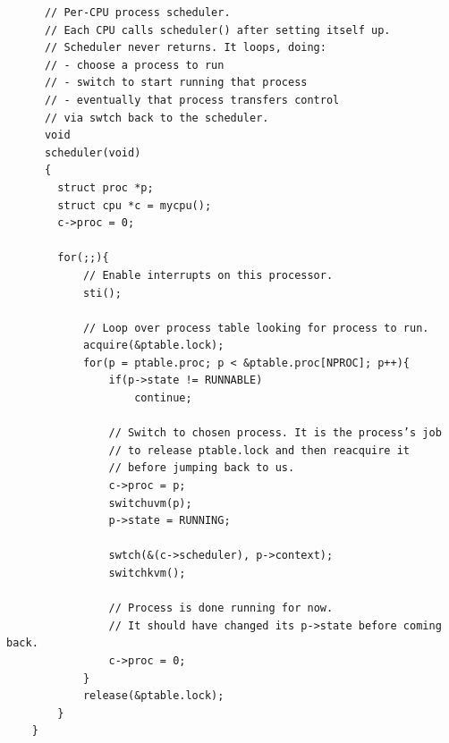 \documentclass[titlepage,a4paper]{article}
\begin{document}
\begin{verbatim}
      // Per-CPU process scheduler.
      // Each CPU calls scheduler() after setting itself up.
      // Scheduler never returns. It loops, doing:
      // - choose a process to run
      // - switch to start running that process
      // - eventually that process transfers control
      // via swtch back to the scheduler.
      void
      scheduler(void)
      {
        struct proc *p;
        struct cpu *c = mycpu();
        c->proc = 0;
    
        for(;;){
            // Enable interrupts on this processor.
            sti();
        
            // Loop over process table looking for process to run.
            acquire(&ptable.lock);
            for(p = ptable.proc; p < &ptable.proc[NPROC]; p++){
                if(p->state != RUNNABLE)
                    continue;
                
                // Switch to chosen process. It is the process’s job
                // to release ptable.lock and then reacquire it
                // before jumping back to us.
                c->proc = p;
                switchuvm(p);
                p->state = RUNNING;
                
                swtch(&(c->scheduler), p->context);
                switchkvm();
                
                // Process is done running for now.
                // It should have changed its p->state before coming back.
                c->proc = 0;
            }
            release(&ptable.lock);
        }
    }
\end{verbatim}



\end{document}
